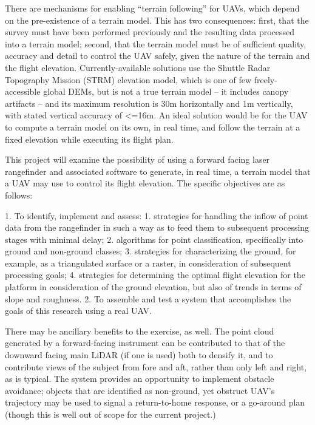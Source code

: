 \documentclass[10pt,a4paper]{report}
\begin{document}
There are mechanisms for enabling “terrain following” for UAVs, which depend on the pre-existence of a terrain model. This has two consequences: first, that the survey must have been performed previously and the resulting data processed into a terrain model; second, that the terrain model must be of sufficient quality, accuracy and detail to control the UAV safely, given the nature of the terrain and the flight elevation. Currently-available solutions use the Shuttle Radar Topography Mission (STRM) elevation model, which is one of few freely-accessible global DEMs, but is not a true terrain model -- it includes canopy artifacts -- and its maximum resolution is 30m horizontally and 1m vertically, with stated vertical accuracy of <=16m. An ideal solution would be for the UAV to compute a terrain model on its own, in real time, and follow the terrain at a fixed elevation while executing its flight plan. 

This project will examine the possibility of using a forward facing laser rangefinder and associated software to generate, in real time, a terrain model that a UAV may use to control its flight elevation. The specific objectives are as follows:

1. To identify, implement and assess:
1. strategies for handling the inflow of point data from the rangefinder in such a way as to feed them to subsequent processing stages with minimal delay;
2. algorithms for point classification, specifically into ground and non-ground classes;
3. strategies for characterizing the ground, for example, as a triangulated surface or a raster, in consideration of subsequent processing goals;
4. strategies for determining the optimal flight elevation for the platform in consideration of the ground elevation, but also of trends in terms of slope and roughness.
2. To assemble and test a system that accomplishes the goals of this research using a real UAV.

There may be ancillary benefits to the exercise, as well. The point cloud generated by a forward-facing instrument can be contributed to that of the downward facing main LiDAR (if one is used) both to densify it, and to contribute views of the subject from fore and aft, rather than only left and right, as is typical. The system provides an opportunity to implement obstacle avoidance;  objects that are identified as non-ground, yet obstruct UAV’s trajectory may be used to signal a return-to-home response, or a go-around plan (though this is well out of scope for the current project.)
\end{document}
